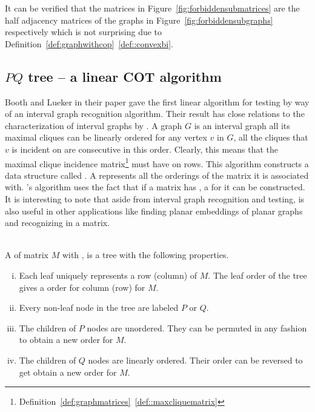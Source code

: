 It can be verified that the matrices in
Figure~\ref{fig:forbiddensubmatrices} are the half adjacency matrices
of the graphs in Figure~\ref{fig:forbiddensubgraphs} respectively
which is not surprising due to
Definition~\ref{def:graphwithcop}~\ref{def::convexbi}.

\subsection{$PQ$ tree -- a linear COT algorithm}

Booth and Lueker in their paper \cite{bl76} gave the first linear
algorithm for \cop testing by way of an interval graph recognition
algorithm. Their result has close relations to the characterization of
interval graphs by \cite{gh64}. A graph $G$ is an interval graph \iff
all its maximal cliques can be linearly ordered \stt for any vertex
$v$ in $G$, all the cliques that $v$ is incident on are consecutive in
this order. Clearly, this means that the maximal clique incidence
matrix\footnote{
  Definition~\ref{def:graphmatrices}~\ref{def::maxcliquematrix}} must
have \COP on rows. This algorithm constructs a data structure called
\PQtree. A \PQtree represents all the \COP orderings of the matrix it
is associated with. \cite{bl76}'s algorithm uses the fact that if a
matrix has \COP, a \PQtree for it can be constructed. It is
interesting to note that aside from interval graph recognition and
\COP testing, \PQtree is also useful in other applications like
finding planar embeddings of planar graphs \cite{lec67,mcc04} and
recognizing \CROP in a matrix.

\begin{definition}\\
  A \PQtree of matrix $M$ with \COP, is a tree with the following properties.
  \begin{enumerate}[i.]
    \singlespacing
  \item Each leaf uniquely represents a row (column) of $M$. The leaf
    order of the tree gives a \COP order for column (row) for $M$.
  \item Every non-leaf node in the tree are labeled $P$ or $Q$.
  \item \label{def::nodep} The children of $P$ nodes are
    unordered. They can be permuted in any fashion to obtain a new
    \COP order for $M$.
  \item \label{def::nodeq} The children of $Q$ nodes are linearly
    ordered. Their order can be reversed to get obtain a new \COP
    order for $M$.
  \end{enumerate}
  \label{def:pqtree}
\end{definition}


